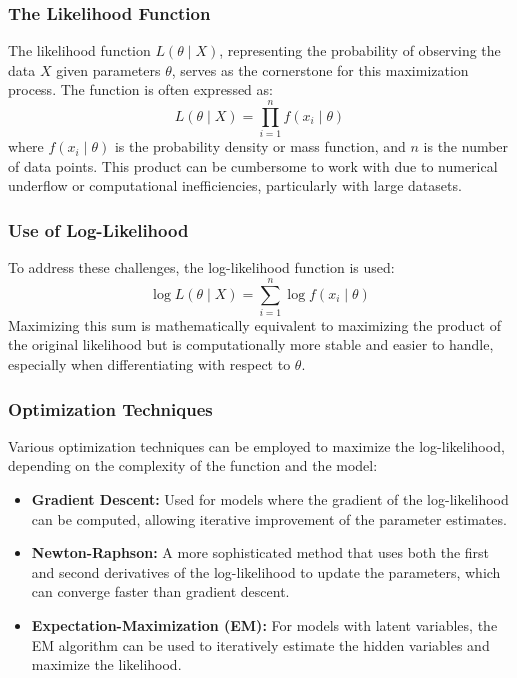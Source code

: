 \subsubsection{The Likelihood Function}
The likelihood function \( L(\theta \mid X) \), representing the probability of observing the data \( X \) given parameters \( \theta \), serves as the cornerstone for this maximization process. The function is often expressed as:
\[
L(\theta \mid X) = \prod_{i=1}^n f(x_i \mid \theta)
\]
where \( f(x_i \mid \theta) \) is the probability density or mass function, and \( n \) is the number of data points. This product can be cumbersome to work with due to numerical underflow or computational inefficiencies, particularly with large datasets.

\subsubsection{Use of Log-Likelihood}
To address these challenges, the log-likelihood function is used:
\[
\log L(\theta \mid X) = \sum_{i=1}^n \log f(x_i \mid \theta)
\]
Maximizing this sum is mathematically equivalent to maximizing the product of the original likelihood but is computationally more stable and easier to handle, especially when differentiating with respect to \( \theta \).

\subsubsection{Optimization Techniques}
Various optimization techniques can be employed to maximize the log-likelihood, depending on the complexity of the function and the model:
\begin{itemize}
    \item \textbf{Gradient Descent:} Used for models where the gradient of the log-likelihood can be computed, allowing iterative improvement of the parameter estimates.
    \item \textbf{Newton-Raphson:} A more sophisticated method that uses both the first and second derivatives of the log-likelihood to update the parameters, which can converge faster than gradient descent.
    \item \textbf{Expectation-Maximization (EM):} For models with latent variables, the EM algorithm can be used to iteratively estimate the hidden variables and maximize the likelihood.
\end{itemize}

